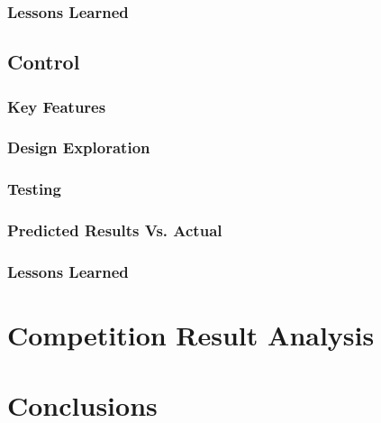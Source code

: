 \documentclass[ece]{uw-wkrpt}
\let\oldsection\section
\renewcommand\section{\clearpage\oldsection}
\begin{document}
\subsubsection{Lessons Learned}

\subsection{Control}

\subsubsection{Key Features}
\subsubsection{Design Exploration}
\subsubsection{Testing}
\subsubsection{Predicted Results Vs. Actual}
\subsubsection{Lessons Learned}

\section{Competition Result Analysis}

\section{Conclusions}

\begingroup
\raggedright
\sloppy

\endgroup

\appendix
\end{document}
